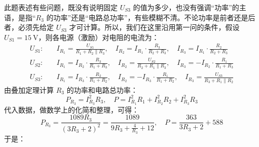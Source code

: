 \documentclass[UTF8]{report}
\theoremstyle{MyLineTheoremStyle} %
\theoremstyle{MyBlockTheoremStyle} %
\theoremstyle{MySubsubsectionStyle} %
\begin{document}
此题表述有些问题，既没有说明固定 $U_{S3}$ 的值为多少，也没有强调“功率”的主语，是指“$R_3$ 的功率”还是“电路总功率”，有些模糊不清。不论功率是前者还是后者，必须先给定 $U_{S3}$ 才可计算。所以，我们在这里沿用第一问的条件，假设 $U_{S1} = 15 \ \mathrm{V}$，则各电源（激励）对电阻的电流为：
\begin{align}
    U_{S1}:\quad & 
    I_{R_1} = \frac{U_{S1}}{R_1 + R_2 \parallel R_3},\quad 
    I_{R_2} = I_{R_1}\cdot \frac{R_3}{R_2 + R_3},\quad 
    I_{R_3} = I_{R_1}\cdot \frac{R_2}{R_2 + R_3} \\ 
    U_{S2}:\quad & 
    I_{R_1} =  I_{R_2}\cdot \frac{R_3}{R_1 + R_3},\quad 
    I_{R_2} =\frac{U_{S2}}{R_2 + R_1 \parallel R_3},\quad  
    I_{R_3} = - I_{R_2}\cdot \frac{R_1}{R_1 + R_3} \\ 
    U_{S3}:\quad & 
    I_{R_1} =  I_{R_3}\cdot \frac{R_2}{R_1+ R_2},\quad 
    I_{R_2} = - I_{R_3}\cdot \frac{R_1}{R_1 + R_2} ,\quad 
    I_{R_3} = \frac{U_{S3}}{R_3 + R_1 \parallel R_2}
\end{align}
由叠加定理计算 $R_3$ 的功率和电路总功率：
\begin{equation}
    P_{R_3} = I_{R_3}^2R_3,\quad P = I_{R_1}^2R_1 + I_{R_2}^2R_2 + I_{R_3}^2R_3
\end{equation}
代入数据，做数学上的化简和整理，可得：
\begin{equation}
    P_{R_3} = \frac{1089 R_3}{(3 R_3 + 2)^2} = \frac{1089}{9 R_3 + \frac{4}{R_3} + 12} ,\quad P = \frac{363}{3R_3 + 2 } + 588
\end{equation}
于是：
\begin{center}
\end{center}

\end{document}
